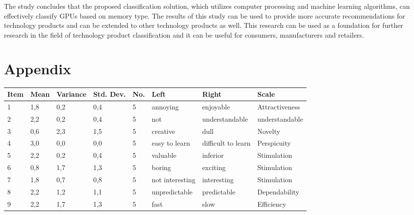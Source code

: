 \documentclass[conference,onecolumn]{IEEEtran}
\begin{document}
	The study concludes that the proposed classification solution, which utilizes computer processing and machine learning algorithms, can effectively classify GPUs based on memory type. The results of this study can be used to provide more accurate recommendations for technology products and can be extended to other technology products as well. This research can be used as a foundation for further research in the field of technology product classification and it can be useful for consumers, manufacturers and retailers. 
	

\newpage
\section*{Appendix}

    \begin{table}[H]	
        \begin{center}
            \begin{tabular}[H]{ |m{1cm}|m{1cm}|m{1.2cm}|m{1.2cm}|m{1cm}|m{2cm}|m{3cm}|m{2cm}|}
                \hline
                \textbf{Item}&\textbf{Mean} &\textbf{Variance} &\textbf{Std. Dev.}  &\textbf{No.}  &\textbf{Left} &\textbf{Right} &\textbf{Scale}\\ \hline
                1	&1,8	&0,2	&0,4	&5	&annoying	            &enjoyable	                &Attractiveness             \\ \hline
                2	&2,2	&0,2	&0,4	&5	&not                    &understandable	            &understandable         \\ \hline
                3	&0,6	&2,3	&1,5	&5	&creative	            &dull	                    &Novelty        \\ \hline
                4	&3,0	&0,0	&0,0	&5	&easy to learn	        &difficult to learn	        &Perspicuity        \\ \hline
                5	&2,2	&0,2	&0,4	&5	&valuable	            &inferior	                &Stimulation        \\ \hline
                6	&0,8	&1,7	&1,3	&5	&boring	                &exciting	                &Stimulation        \\ \hline
                7	&1,8	&0,7	&0,8	&5	&not interesting	    &interesting	            &Stimulation        \\ \hline
                8	&2,2	&1,2	&1,1	&5	&unpredictable	        &predictable	            &Dependability      \\ \hline
                9	&2,2	&1,7	&1,3	&5	&fast	                &slow	                    &Efficiency     \\ \hline

\end{tabular}
\end{center}
\end{table}
\end{document}
